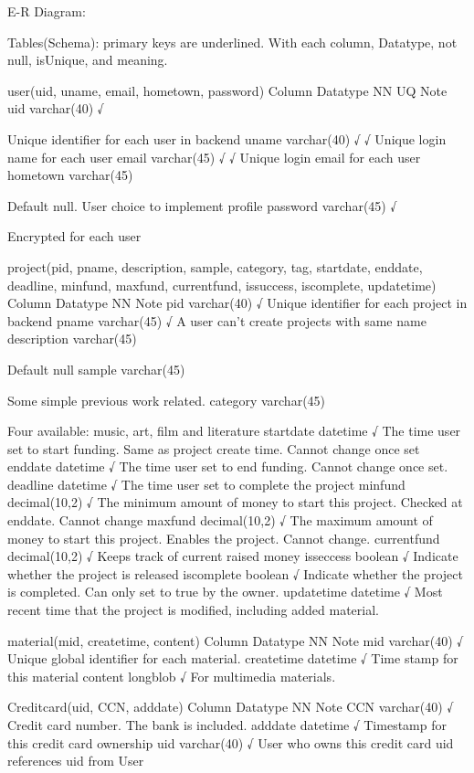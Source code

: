E-R Diagram:


Tables(Schema):
primary keys are underlined. With each column, Datatype, not null, isUnique, and meaning.

user(uid, uname, email, hometown, password)
Column
Datatype
NN
UQ
Note
uid
varchar(40)
√


Unique identifier for each user in backend
uname
varchar(40)
√
√
Unique login name for each user
email
varchar(45)
√
√
Unique login email for each user
hometown
varchar(45)




Default null. User choice to implement profile
password
varchar(45)
√


Encrypted for each user

project(pid, pname, description, sample, category, tag, startdate, enddate, deadline, minfund, maxfund, currentfund, issuccess, iscomplete, updatetime)
Column
Datatype
NN
Note
pid
varchar(40)
√
Unique identifier for each project in backend
pname
varchar(45)
√
A user can't create projects with same name
description
varchar(45)
 
Default null
sample
varchar(45)
 
Some simple previous work related.
category
varchar(45)


Four available: music, art, film and literature
startdate
datetime
√
The time user set to start funding. Same as project create time. Cannot change once set
enddate
datetime
√
The time user set to end funding. Cannot change once set.
deadline
datetime
√
The time user set to complete the project
minfund
decimal(10,2)
√
The minimum amount of money to start this project. Checked at enddate. Cannot change
maxfund
decimal(10,2)
√
The maximum amount of money to start this project. Enables the project. Cannot change.
currentfund
decimal(10,2)
√
Keeps track of current raised money
isseccess
boolean
√
Indicate whether the project is released
iscomplete
boolean
√
Indicate whether the project is completed. Can only set to true by the owner.
updatetime
datetime
√
Most recent time that the project is modified, including added material.

material(mid, createtime, content)
Column
Datatype
NN
Note
mid
varchar(40)
√
Unique global identifier for each material.
createtime
datetime
√
Time stamp for this material
content
longblob
√
For multimedia materials.

Creditcard(uid, CCN, adddate)
Column
Datatype
NN
Note
CCN
varchar(40)
√
Credit card number. The bank is included.
adddate
datetime
√
Timestamp for this credit card ownership
uid
varchar(40)
√
User who owns this credit card
uid references uid from User

